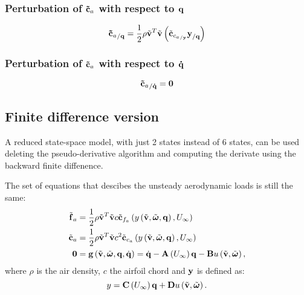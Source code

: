 \subsubsection{Perturbation of $\bm{\mathbf{\tilde{c}}}_a$ with respect to $\bm{\mathbf{q}}$}
\begin{equation}
{\bm{\mathbf{\tilde{c}}}_a}_{/\bm{\mathbf{q}}} = 
	\frac{1}{2} \rho \tilde{\bm{\mathbf{v}}}^T \tilde{\bm{\mathbf{v}}} 
	\left(  \tilde{\bm{\mathbf{c}}}_{{c_{a}}_{/\bm{\mathbf{y}}}} \bm{\mathbf{y}}_{/\bm{\mathbf{q}}}  \right) 
\end{equation}
\subsubsection{Perturbation of $\bm{\mathbf{\tilde{c}}}_a$ with respect to $\bm{\mathbf{\dot{q}}}$}
\begin{equation}
{\bm{\mathbf{\tilde{c}}}_a}_{/\bm{\mathbf{\dot{q}}}} = \bm{\mathbf{0}}
\end{equation}

\subsection{Finite difference version}

A reduced state-space model, with just 2 states instead of 6 states, can be
used deleting the pseudo-derivative algorithm and computing the derivate using
the backward finite diffenence.

The set of equations that descibes the unsteady aerodynamic loads is still the same:
\begin{subequations}
\begin{align}
	\tilde{\bm{\mathbf{f}}}_a &= 
		\frac{1}{2} \rho \tilde{\bm{\mathbf{v}}}^T \tilde{\bm{\mathbf{v}}} c
		\tilde{\bm{\mathbf{c}}}_{f_{a}}
		\left(  y 
		\left(  \tilde{\bm{\mathbf{v}}}, \tilde{\bm{\mathbf{\omega}}}, \bm{\mathbf{q}} \right), U_\infty \right)\\
	\tilde{\bm{\mathbf{c}}}_a &= 
		\frac{1}{2} \rho \tilde{\bm{\mathbf{v}}}^T \tilde{\bm{\mathbf{v}}} c^2
		\tilde{\bm{\mathbf{c}}}_{c_{a}} 
		\left(  y 
		\left(  \tilde{\bm{\mathbf{v}}}, \tilde{\bm{\mathbf{\omega}}}, \bm{\mathbf{q}} \right), U_\infty \right)\\
	\bm{\mathbf{0}} &=
		\bm{\mathbf{g}}\left( \tilde{\bm{\mathbf{v}}},\tilde{\bm{\mathbf{\omega}}},\bm{\mathbf{q}}, \dot{\bm{\mathbf{q}}} \right) = 
		\dot{\bm{\mathbf{q}}} - \bm{\mathbf{A}}\left( U_\infty \right) \bm{\mathbf{q}} - \bm{\mathbf{B}}
 		u\left( \tilde{\bm{\mathbf{v}}}, \tilde{\bm{\mathbf{\omega}}} \right),
\end{align}
\end{subequations}
where $\rho$ is the air density, $c$ the airfoil chord and $\bm{\mathbf{y}}$ is defined as:
\begin{equation}
	y = \bm{\mathbf{C}}\left( U_\infty \right) \bm{\mathbf{q}} + \bm{\mathbf{D}} 
 		u\left( \tilde{\bm{\mathbf{v}}}, \tilde{\bm{\mathbf{\omega}}} \right).
\end{equation}

